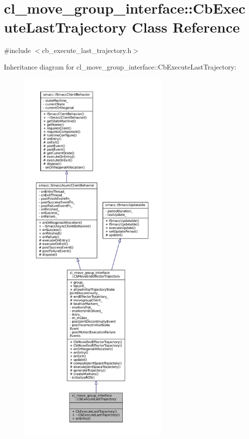 \hypertarget{classcl__move__group__interface_1_1CbExecuteLastTrajectory}{}\section{cl\+\_\+move\+\_\+group\+\_\+interface\+:\+:Cb\+Execute\+Last\+Trajectory Class Reference}
\label{classcl__move__group__interface_1_1CbExecuteLastTrajectory}


{\ttfamily \#include $<$cb\+\_\+execute\+\_\+last\+\_\+trajectory.\+h$>$}



Inheritance diagram for cl\+\_\+move\+\_\+group\+\_\+interface\+:\+:Cb\+Execute\+Last\+Trajectory\+:
\nopagebreak
\begin{figure}[H]
\begin{center}
\leavevmode
\includegraphics[height=550pt]{classcl__move__group__interface_1_1CbExecuteLastTrajectory__inherit__graph}
\end{center}
\end{figure}


